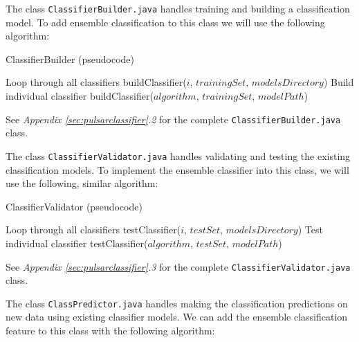 \documentclass{article}
\begin{document}
\begin{appendices}
\begin{subappendices}
The class \verb|ClassifierBuilder.java| handles training and building a classification model. To add ensemble classification to this class we will use the following algorithm:

\begin{algorithm}[H]
    \caption{ClassifierBuilder (pseudocode)}
    \begin{algorithmic}[1]
                \Comment Loop through all classifiers
                \State buildClassifier($i$, $trainingSet$, $modelsDirectory$)
            \EndFor
        \Else 
            \Comment Build individual classifier
            \State buildClassifier($algorithm$, $trainingSet$, $modelPath$)
            
        \EndIf
        
    \end{algorithmic}
\end{algorithm}

See \emph{Appendix \ref{sec:pulsarclassifier}.2} for the complete \verb|ClassifierBuilder.java| class. 

The class \verb|ClassifierValidator.java| handles validating and testing the existing classification models. To implement the ensemble classifier into this class, we will use the following, similar algorithm:

\begin{algorithm}[H]
    \caption{ClassifierValidator (pseudocode)}
    \begin{algorithmic}[1]
                \Comment Loop through all classifiers
                \State testClassifier($i$, $testSet$, $modelsDirectory$)
            \EndFor
        \Else 
            \Comment Test individual classifier
            \State testClassifier($algorithm$, $testSet$, $modelPath$)
        \EndIf
        
    \end{algorithmic}
\end{algorithm}

See \emph{Appendix \ref{sec:pulsarclassifier}.3} for the complete \verb|ClassifierValidator.java| class. 

The class \verb|ClassPredictor.java| handles making the classification predictions on new data using existing classifier models. We can add the ensemble classification feature to this class with the following algorithm:


\end{subappendices}
\end{appendices}
\end{document}
